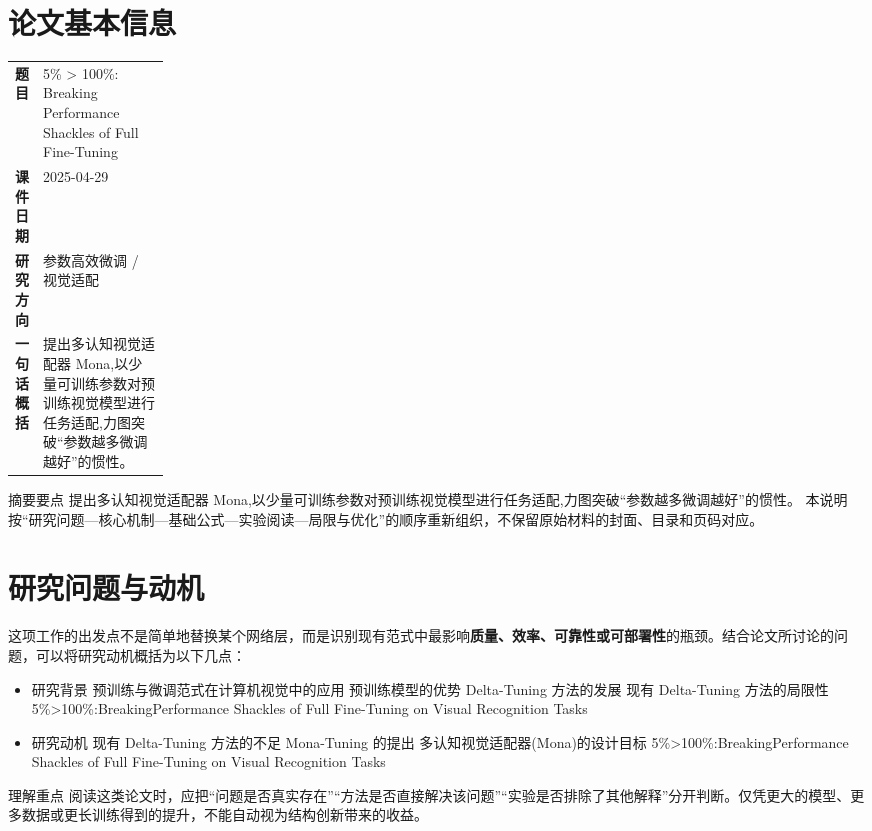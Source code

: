 \documentclass[UTF8,11pt,a4paper]{ctexart}
\newcommand{\term}[1]{\textbf{\textcolor{mainblue}{#1}}}
\begin{document}
\section{论文基本信息}
\begin{center}
\begin{tabularx}{0.94\linewidth}{>{\bfseries}p{0.18\linewidth}X}
\toprule
题目 & 5\% > 100\%: Breaking Performance Shackles of Full Fine-Tuning\\
课件日期 & 2025-04-29\\
研究方向 & 参数高效微调 / 视觉适配\\
一句话概括 & 提出多认知视觉适配器 Mona,以少量可训练参数对预训练视觉模型进行任务适配,力图突破“参数越多微调越好”的惯性。\\
\bottomrule
\end{tabularx}
\end{center}

\begin{infobox}{摘要要点}
提出多认知视觉适配器 Mona,以少量可训练参数对预训练视觉模型进行任务适配,力图突破“参数越多微调越好”的惯性。 本说明按“研究问题—核心机制—基础公式—实验阅读—局限与优化”的顺序重新组织，不保留原始材料的封面、目录和页码对应。
\end{infobox}

\section{研究问题与动机}
这项工作的出发点不是简单地替换某个网络层，而是识别现有范式中最影响\term{质量、效率、可靠性或可部署性}的瓶颈。结合论文所讨论的问题，可以将研究动机概括为以下几点：
\begin{itemize}
\item 研究背景 预训练与微调范式在计算机视觉中的应用 预训练模型的优势 Delta-Tuning 方法的发展 现有 Delta-Tuning 方法的局限性 5\%>100\%:BreakingPerformance Shackles of Full Fine-Tuning on Visual Recognition Tasks
\item 研究动机 现有 Delta-Tuning 方法的不足 Mona-Tuning 的提出 多认知视觉适配器(Mona)的设计目标 5\%>100\%:BreakingPerformance Shackles of Full Fine-Tuning on Visual Recognition Tasks
\end{itemize}

\begin{notebox}{理解重点}
阅读这类论文时，应把“问题是否真实存在”“方法是否直接解决该问题”“实验是否排除了其他解释”分开判断。仅凭更大的模型、更多数据或更长训练得到的提升，不能自动视为结构创新带来的收益。
\end{notebox}
\end{document}
